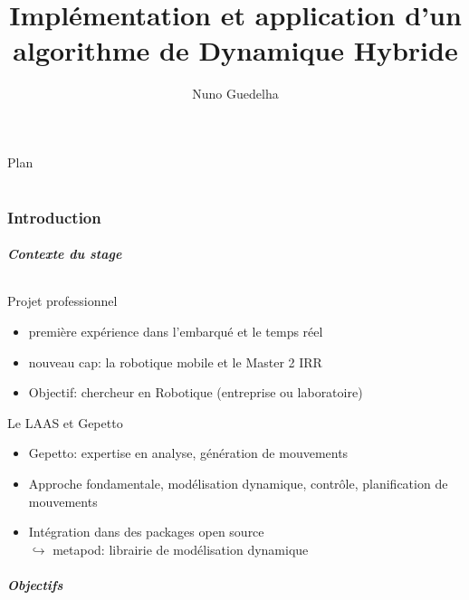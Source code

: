 \documentclass[11pt]{beamer}
\author{Nuno Guedelha}
\title{Implémentation et application d'un algorithme de Dynamique Hybride}
\institute{LAAS-CNRS}
\date{}
\begin{document}


\begin{frame}
\titlepage
\end{frame}

\begin{frame}{Plan}
\tableofcontents[part=01]
\tableofcontents[part=02]
\end{frame}

\part{}

\section{Introduction}

\begin{frame}
  \frametitle{Contexte du stage}
  \framesubtitle{}
  \begin{block}{Projet professionnel}
  \begin{itemize}
    \item première expérience dans l'embarqué et le temps réel
    \item nouveau cap: la robotique mobile et le Master 2 IRR
    \item Objectif: chercheur en Robotique (entreprise ou laboratoire)
  \end{itemize}
  \end{block}
  \begin{block}{Le LAAS et Gepetto}
  \begin{itemize}
    \item Gepetto: expertise en analyse, génération de mouvements  
    \item Approche fondamentale, modélisation dynamique, contrôle, planification de mouvements
    \item {Intégration dans des packages open source \\
          $\hookrightarrow$ metapod: librairie de modélisation dynamique}
    \note{}
  \end{itemize}
  \end{block}
\end{frame}

\begin{frame}
  \frametitle{Objectifs}
  \framesubtitle{}
\end{frame}
\end{document}
